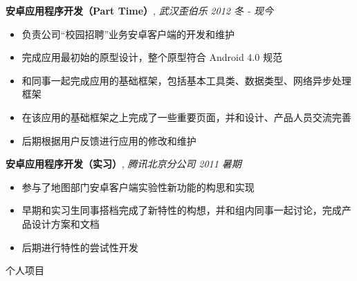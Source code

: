 \documentclass[9pt]{ctexart}
\newenvironment{changemargin}[2]{%
    \begin{list}{}{%
            \setlength{\topsep}{0pt}%
            \setlength{\leftmargin}{#1}%
            \setlength{\rightmargin}{#2}%
            \setlength{\listparindent}{\parindent}%
        \setlength{\itemindent}{\parindent}%
            \setlength{\parsep}{\parskip}%
        }%
  \item[]}{\end{list}
      }
\newcommand{\lineover}{
          \begin{changemargin}{-0.05in}{-0.05in}
              \vspace*{-8pt}
              \hrulefill \\
              \vspace*{-2pt}
          \end{changemargin}
      }
\newcommand{\header}[1]{
          \begin{changemargin}{-0.5in}{-0.5in}
              \scshape{#1}\\
              \lineover
          \end{changemargin}
      }
\newenvironment{body} {
          \vspace*{-16pt}
          \begin{changemargin}{-0.25in}{-0.5in}
          }	
      {\end{changemargin}
      }
\begin{document}
      \begin{body}
          \vspace{14pt}
          \textbf{安卓应用程序开发（Part Time）}, \emph{武汉歪伯乐} \hfill \emph{2012 冬 - 现今}\\
          \vspace*{-4pt}
      \begin{itemize} \itemsep -0pt  %
              \item 负责公司“校园招聘”业务安卓客户端的开发和维护
              \item 完成应用最初始的原型设计，整个原型符合 Android 4.0 规范
              \item 和同事一起完成应用的基础框架，包括基本工具类、数据类型、网络异步处理框架
              \item 在该应用的基础框架之上完成了一些重要页面，并和设计、产品人员交流完善
              \item 后期根据用户反馈进行应用的修改和维护
          \end{itemize}

          \textbf {安卓应用程序开发（实习）}, \emph{腾讯北京分公司} \hfill \emph{2011 暑期}\\
          \vspace*{-4pt}
      \begin{itemize} \itemsep -0pt
              \item 参与了地图部门安卓客户端实验性新功能的构思和实现
              \item 早期和实习生同事搭档完成了新特性的构想，并和组内同事一起讨论，完成产品设计方案和文档
              \item 后期进行特性的尝试性开发
          \end{itemize}
      \end{body}

      \smallskip


      \header{个人项目}
\end{document}

